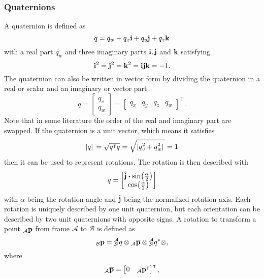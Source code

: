 \subsubsection{Quaternions}
A quaternion is defined as
\begin{equation}
	q = q_w + q_x\vb{i} + q_y\vb{j} + q_z\vb{k}
\end{equation}
with a real part $q_w$ and three imaginary parts $\vb{i}, \vb{j}$ and $\vb{k}$ satisfying
\begin{equation}
	\vb{i}^2 = \vb{j}^2 = \vb{k}^2 = \vb{i}\vb{j}\vb{k} = -1.
\end{equation}
The quaternion can also be written in vector form by dividing the quaternion in a real or scalar and an imaginary or vector part
\begin{equation}
	q = \begin{bmatrix}
		q_v \\
		q_w
	\end{bmatrix}
	=\begin{bmatrix}
		q_x & q_y & q_z & q_w
	\end{bmatrix}^\intercal.
\end{equation}
Note that in some literature the order of the real and imaginary part are swapped.
If the quaternion is a unit vector, which means it satisfies
\begin{equation}
	\abs*{q} = \sqrt{q^\intercal q} = \sqrt{\abs*{q_v^2 + q_w^2}} = 1
\end{equation}
then it can be used to represent rotations.
The rotation is then described with
\begin{equation}
	q =
	\begin{bmatrix}
		\hat{\vb{j}}\vdot\sin(\frac{\alpha}{2}) \\
		\cos(\frac{\alpha}{2})
	\end{bmatrix}
\end{equation}
with $\alpha$ being the rotation angle and $\hat{\vb{j}}$ being the normalized rotation axis.
Each rotation is uniquely described by one unit quaternion, but each orientation can be described by two unit quaternions with opposite signs.
A rotation to transform a point ${}_\mathcal{A}\vb{p}$ from frame $\mathcal{A}$ to $\mathcal{B}$ is defined as
\begin{equation}
	{}_\mathcal{B}\vb{p} = \qtf{a}{b} \otimes {}_\mathcal{A}\overline{\vb{p}} \otimes \qtf{a}{b}^* \otimes,
\end{equation}
where
\begin{equation}
	{}_\mathcal{A}\overline{\vb{p}} = \begin{bmatrix}
		0 & {}_\mathcal{A}\vb{p}^\intercal
	\end{bmatrix}^\intercal,
\end{equation}
